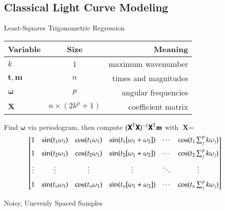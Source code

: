 \documentclass[serif,mathserif,professionalfont]{beamer}
\begin{document}
\subsection{Classical Light Curve Modeling}
\begin{frame}{Least-Squares Trigonometric Regression}%
\begin{center}
\begin{tabular}{lcr}
\textbf{Variable} & \textbf{Size} & \textbf{Meaning} \\ \hline\hline
$k$ & 1 & maximum wavenumber \\
$\mathbf{t}, \mathbf{m}$ & $n$ & times and magnitudes \\
$\boldsymbol \omega$ & $p$ & angular frequencies \\
$\mathbf X$ & ${n \times (2k^p+1)}$ & coefficient matrix \\ \hline
\end{tabular}
\end{center}
\begin{center}
Find $\boldsymbol \omega$ via periodogram, then compute $(\textsf{\textbf{X}}^\text{T} \textsf{\textbf{X}})^{-1} \textsf{\textbf{X}}^\text{T} \mathbf{m}$ with $\textbf{X} = $ \setlength{\arraycolsep}{4pt} $$ 
\hspace*{-3mm} \begin{bmatrix}
1 & \sin(t_1 \omega_1)
  & \cos(t_1 \omega_1)
  & \sin(t_1 [\omega_1 + \omega_2]) & \cdots
  & \cos(t_1 \sum_j^{p} k\omega_j) \\[1.5ex]

1 & \sin(t_2 \omega_1)
  & \cos(t_2 \omega_1) 
  & \sin(t_2 [\omega_1 + \omega_2]) & \cdots
  & \cos(t_2 \sum_j^p k\omega_j) \\[1.5ex]

\vdots & \vdots 
       & \vdots 
       & \vdots & \ddots 
       & \vdots \\[1.5ex]

1 & \sin(t_n \omega_1)
  & \cos(t_n \omega_1) 
  & \sin(t_n [\omega_1 + \omega_2]) & \cdots
  & \cos(t_n \sum_j^p k\omega_j)
\end{bmatrix} $$
\end{center}
\end{frame}

\begin{frame}{Noisy, Unevenly Spaced Samples}
\begin{figure}
\centering

\end{figure} 
\end{frame}
\end{document}
